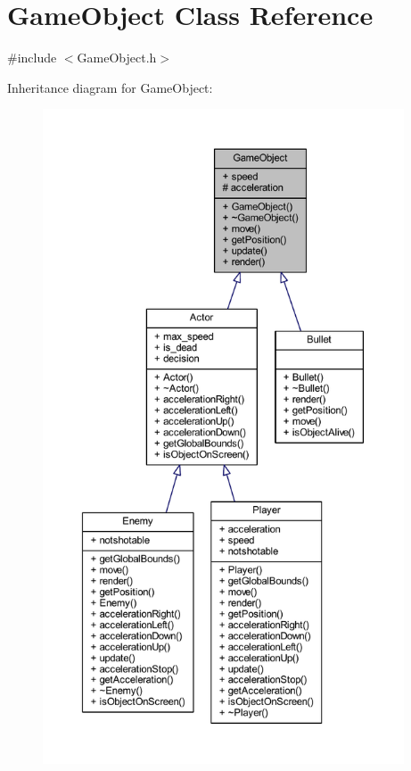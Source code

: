 \hypertarget{class_game_object}{}\section{Game\+Object Class Reference}
\label{class_game_object}


{\ttfamily \#include $<$Game\+Object.\+h$>$}



Inheritance diagram for Game\+Object\+:
\nopagebreak
\begin{figure}[H]
\begin{center}
\leavevmode
\includegraphics[height=550pt]{class_game_object__inherit__graph}
\end{center}
\end{figure}


